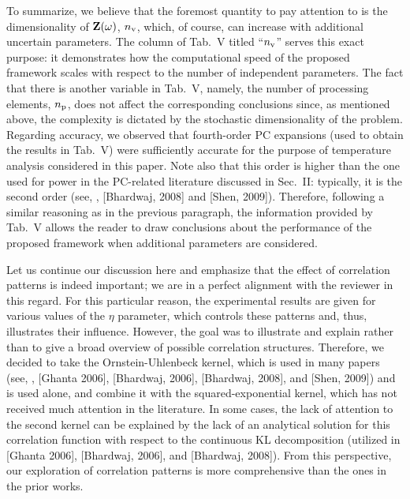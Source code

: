\begin{authors}
To summarize, we believe that the foremost quantity to pay attention to is the dimensionality of $\mathbf{Z}(\omega)$, ${n_\text{v}}$, which, of course, can increase with additional uncertain parameters.
The column of Tab.~V titled ``${n_\text{v}}$'' serves this exact purpose: it demonstrates how the computational speed of the proposed framework scales with respect to the number of independent parameters.
The fact that there is another variable in Tab.~V, namely, the number of processing elements, ${n_\text{p}}$, does not affect the corresponding conclusions since, as mentioned above, the complexity is dictated by the stochastic dimensionality of the problem.
Regarding accuracy, we observed that fourth-order PC expansions (used to obtain the results in Tab.~V) were sufficiently accurate for the purpose of temperature analysis considered in this paper.
Note also that this order is higher than the one used for power in the PC-related literature discussed in Sec.~II: typically, it is the second order (see, \eg, [Bhardwaj, 2008] and [Shen, 2009]).
Therefore, following a similar reasoning as in the previous paragraph, the information provided by Tab.~V allows the reader to draw conclusions about the performance of the proposed framework when additional parameters are considered.

Let us continue our discussion here and emphasize that the effect of correlation patterns is indeed important; we are in a perfect alignment with the reviewer in this regard.
For this particular reason, the experimental results are given for various values of the $\eta$ parameter, which controls these patterns and, thus, illustrates their influence.
However, the goal was to illustrate and explain rather than to give a broad overview of possible correlation structures.
Therefore, we decided to take the Ornstein-Uhlenbeck kernel, which is used in many papers (see, \eg, [Ghanta 2006], [Bhardwaj, 2006], [Bhardwaj, 2008], and [Shen, 2009]) and is used alone, and combine it with the squared-exponential kernel, which has not received much attention in the literature.
In some cases, the lack of attention to the second kernel can be explained by the lack of an analytical solution for this correlation function with respect to the continuous KL decomposition (utilized in [Ghanta 2006], [Bhardwaj, 2006], and [Bhardwaj, 2008]).
From this perspective, our exploration of correlation patterns is more comprehensive than the ones in the prior works.


\end{authors}
